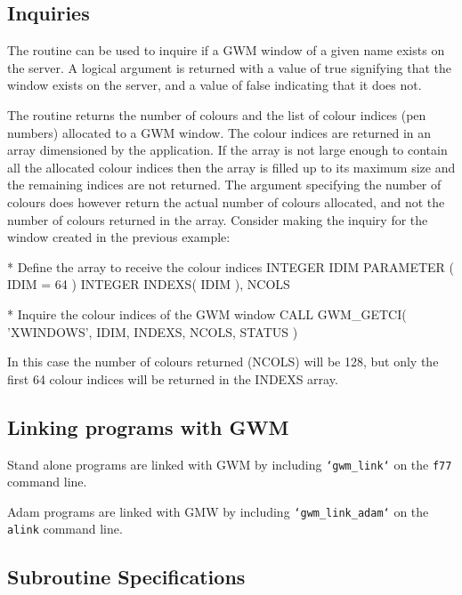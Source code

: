 \documentclass[twoside,11pt,nolof]{starlink}
\begin{document}
\subsection{Inquiries}
The routine \texttt{}
can be used to inquire if a GWM window of
a given name exists on the server. A logical argument is returned with
a value of true signifying that the window exists on the server, and
a value of false indicating that it does not.

The routine \texttt{}
returns the number of colours and the list
of colour indices (pen numbers) allocated to a GWM window. The colour
indices are returned in an array dimensioned by the application. If the
array is not large enough to contain all the allocated colour indices
then the array is filled up to its maximum size and the remaining indices
are not returned. The argument specifying the number of colours does
however return the actual number of colours allocated, and not the number
of colours returned in the array. Consider making the inquiry for
the window created in the previous example:

\begin{small}
\begin{terminalv}
*   Define the array to receive the colour indices
     INTEGER IDIM
     PARAMETER ( IDIM = 64 )
     INTEGER INDEXS( IDIM ), NCOLS

*   Inquire the colour indices of the GWM window
     CALL GWM_GETCI( 'XWINDOWS', IDIM, INDEXS, NCOLS, STATUS )
\end{terminalv}
\end{small}

In this case the number of colours returned (NCOLS) will be 128, but
only the first 64 colour indices will be returned in the INDEXS array.

\subsection{Linking programs with GWM}
Stand alone programs are linked with GWM by including
\texttt{`gwm\_link`} on the \texttt{f77} command line.

Adam programs are linked with GMW by including \texttt{`gwm\_link\_adam`} on the
\texttt{alink} command line.

\newpage
\subsection{Subroutine Specifications}
\end{document}
